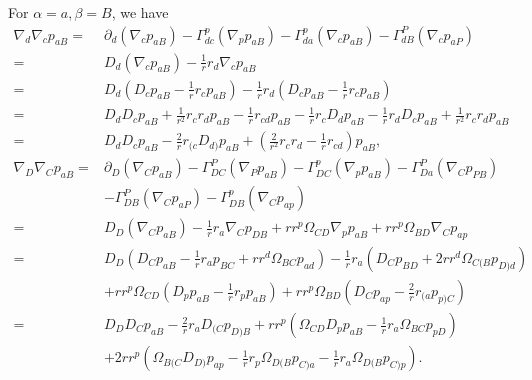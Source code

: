 \documentclass[12pt]{report}
\begin{document}
For $\alpha=a,\beta=B$, we have
\begin{subequations}
\label{eq:scd_der_metric_pert_aB}
\begin{align}
    \nabla_d\nabla_cp_{aB}
    =&
    \partial_d\left(\nabla_cp_{aB}\right)
    -
    \Gamma^p_{dc}\left(\nabla_pp_{aB}\right)
    -
    \Gamma^p_{da}\left(\nabla_cp_{aB}\right)
    -
    \Gamma^P_{dB}\left(\nabla_cp_{aP}\right)
    \nonumber\\
    =&
    D_d\left(\nabla_cp_{aB}\right)
    -
    \frac{1}{r}r_d\nabla_cp_{aB}
    \nonumber\\
    =&
    D_d\left(D_cp_{aB} - \frac{1}{r}r_cp_{aB}\right)
    -
    \frac{1}{r}r_d\left(D_cp_{aB} - \frac{1}{r}r_cp_{aB}\right)
    \nonumber\\
    =&
    D_dD_cp_{aB} 
    + 
    \frac{1}{r^2}r_{c}r_{d}p_{aB}
    - 
    \frac{1}{r}r_{cd}p_{aB}
    - 
    \frac{1}{r}r_{c}D_dp_{aB}
    -
    \frac{1}{r}r_dD_cp_{aB} 
    +
    \frac{1}{r^2}r_cr_dp_{aB}
    \nonumber\\
    =&
    D_dD_cp_{aB} 
    - 
    \frac{2}{r}r_{(c}D_{d)}p_{aB}
    + 
    \left(
        \frac{2}{r^2}r_{c}r_{d}
        - 
        \frac{1}{r}r_{cd}
    \right)
    p_{aB}
    ,\\
    \nabla_D\nabla_Cp_{aB}
    =&
    \partial_D\left(\nabla_Cp_{aB}\right)
    -
    \Gamma^P_{DC}\left(\nabla_Pp_{aB}\right)
    -
    \Gamma^p_{DC}\left(\nabla_pp_{aB}\right)
    -
    \Gamma^P_{Da}\left(\nabla_Cp_{PB}\right)
    \nonumber\\
    &
    -
    \Gamma^P_{DB}\left(\nabla_Cp_{aP}\right)
    -
    \Gamma^p_{DB}\left(\nabla_Cp_{ap}\right)
    \nonumber\\
    =&
    D_D\left(\nabla_Cp_{aB}\right)
    -
    \frac{1}{r}r_a\nabla_Cp_{DB}
    +
    rr^p \Omega_{CD} \nabla_pp_{aB}
    +
    rr^p\Omega_{BD}\nabla_Cp_{ap}
    \nonumber\\
    =&
    D_D\left(D_Cp_{aB} - \frac{1}{r}r_ap_{BC} + r r^d\Omega_{BC}p_{ad}\right)
    -
    \frac{1}{r}r_a\left(
        D_Cp_{BD}
        +
        2rr^d\Omega_{C(B}p_{D)d}
    \right)
    \nonumber\\
    &
    +
    rr^p \Omega_{CD}\left(
        D_pp_{aB}
        -
        \frac{1}{r}r_pp_{aB}
    \right)
    +
    rr^p\Omega_{BD}\left(
        D_Cp_{ap}
        -
        \frac{2}{r}r_{(a}p_{p)C}
    \right)
    \nonumber\\
    =&
    D_DD_Cp_{aB}
    -
    \frac{2}{r}r_aD_{(C}p_{D)B}
    +
    r r^p\left(
        \Omega_{CD}D_pp_{aB}
        -
        \frac{1}{r}r_a\Omega_{BC}p_{pD}
    \right)
    \nonumber\\
    &
    +
    2rr^p\left(
        \Omega_{B(C}D_{D)}p_{ap}
        -
        \frac{1}{r}r_p\Omega_{D(B}p_{C)a}
        -
        \frac{1}{r}r_a\Omega_{D(B}p_{C)p}
    \right)
    .
\end{align}
\end{subequations}
\end{document}
